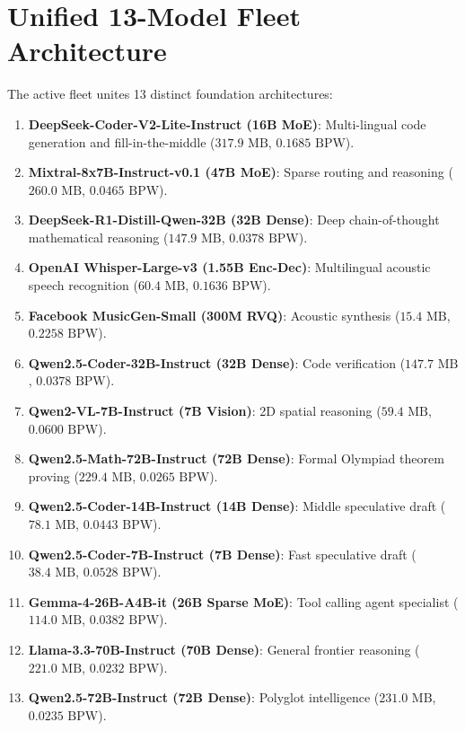 \documentclass[11pt,a4paper]{article}
\begin{document}
\section{Unified 13-Model Fleet Architecture}
The active fleet unites 13 distinct foundation architectures:
\begin{enumerate}
    \item \textbf{DeepSeek-Coder-V2-Lite-Instruct (16B MoE)}: Multi-lingual code generation and fill-in-the-middle ($317.9\text{ MB}$, $0.1685\text{ BPW}$).
    \item \textbf{Mixtral-8x7B-Instruct-v0.1 (47B MoE)}: Sparse routing and reasoning ($260.0\text{ MB}$, $0.0465\text{ BPW}$).
    \item \textbf{DeepSeek-R1-Distill-Qwen-32B (32B Dense)}: Deep chain-of-thought mathematical reasoning ($147.9\text{ MB}$, $0.0378\text{ BPW}$).
    \item \textbf{OpenAI Whisper-Large-v3 (1.55B Enc-Dec)}: Multilingual acoustic speech recognition ($60.4\text{ MB}$, $0.1636\text{ BPW}$).
    \item \textbf{Facebook MusicGen-Small (300M RVQ)}: Acoustic synthesis ($15.4\text{ MB}$, $0.2258\text{ BPW}$).
    \item \textbf{Qwen2.5-Coder-32B-Instruct (32B Dense)}: Code verification ($147.7\text{ MB}$, $0.0378\text{ BPW}$).
    \item \textbf{Qwen2-VL-7B-Instruct (7B Vision)}: 2D spatial reasoning ($59.4\text{ MB}$, $0.0600\text{ BPW}$).
    \item \textbf{Qwen2.5-Math-72B-Instruct (72B Dense)}: Formal Olympiad theorem proving ($229.4\text{ MB}$, $0.0265\text{ BPW}$).
    \item \textbf{Qwen2.5-Coder-14B-Instruct (14B Dense)}: Middle speculative draft ($78.1\text{ MB}$, $0.0443\text{ BPW}$).
    \item \textbf{Qwen2.5-Coder-7B-Instruct (7B Dense)}: Fast speculative draft ($38.4\text{ MB}$, $0.0528\text{ BPW}$).
    \item \textbf{Gemma-4-26B-A4B-it (26B Sparse MoE)}: Tool calling agent specialist ($114.0\text{ MB}$, $0.0382\text{ BPW}$).
    \item \textbf{Llama-3.3-70B-Instruct (70B Dense)}: General frontier reasoning ($221.0\text{ MB}$, $0.0232\text{ BPW}$).
    \item \textbf{Qwen2.5-72B-Instruct (72B Dense)}: Polyglot intelligence ($231.0\text{ MB}$, $0.0235\text{ BPW}$).
\end{enumerate}
\end{document}
